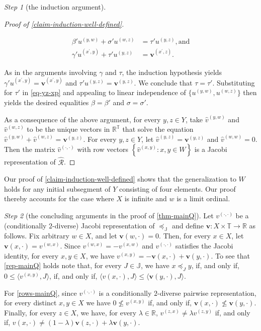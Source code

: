 \documentclass[ecta,nameyear,draft]{econsocart}
\newcommand{\R}{\mathbb R}
\newcommand{\hext}{\mathrel{\hat{\mathrel{\mathcal R}}}}
\newcommand{\mbbt}{{\mathds {T}}}
\newcommand{\mbbj}{\mathds J}
\newcommand{\xy}{{(x, y)}}
\newcommand{\yz}{{(y,z)}}
\newcommand{\zy}{{(z,y)}}
\newcommand{\zx}{{(z,x)}}
\newcommand{\xw}{{(x,w)}}
\newcommand{\wx}{{(w,x)}}
\newcommand{\yw}{{(y,w)}}
\newcommand{\wz}{(w,z)}
\newcommand{\xpy}{(x^{\prime},y)}
\newcommand{\xpz}{(x^{\prime},z)}
\newcommand{\dd}{{(\cdot,\cdot)}}
\renewcommand{\v}{{\mathbf{v}}}
\theoremstyle{plain}
\theoremstyle{remark}
\newtheorem{step}{Step}[section]
\begin{document}
\begin{appendix}
\begin{step}[the induction argument]
\begin{proofEnd}
\begin{proof}[Proof of \cref{claim-induction-well-defined}]
\begin{linenomath*}
\begin{align}
      \label{eq-yz-xp}
      \beta' u^{\yw} + \sigma' u^{\wz}& = \tau' u^{\yz}, \text{and}\\
      \label{eq-xpz-y}
      \gamma' u^{\xpy} + \tau' u^{\yz} &= \v^{\xpz}.
   \end{align}
  \end{linenomath*}
  \addtocounter{linenumber}{-1} As in the arguments involving $\gamma$ and
  $\tau$, the induction hypothesis yields
  $\gamma ' u^{\xpy} = \v^{\xpy}$ and $\tau ' u^{\yz} = \v^{\yz}$.
  We conclude that $\tau = \tau'$.  Substituting for $\tau'$ in \cref{eq-yz-xp}
  and appealing to linear independence of $\{u^{\yw}, u^{\wz}\}$ then yields the
  desired equalities $\beta = \beta'$ and $\sigma = \sigma '$.
    
    As a consequence of the above argument, for every $y , z \in Y$, take
    $\hat{v}^{\yw}$ and $\hat{v}^{\wz}$ to be the unique vectors in $\R^{\mbbt}$
    that solve the equation $\hat{v}^{\yw} + \hat{v}^{\wz} = \v^{\yz}$.
    For every $y , z \in Y$, let $\hat{v}^{\yz} = \v^{\yz}$ and $\hat{v}^{(w,w)}
    = 0$.  Then the matrix $\hat{v}^{\dd}$ with row vectors $\left\{
      \hat{v}^{\xy}: x , y \in W \right\}$ is a Jacobi representation of $\hext$.
  \end{proof}
  Our proof of \cref{claim-induction-well-defined} shows that the
  generalization to $W$ holds for any initial subsegment of $Y$ consisting of
  four elements. Our proof thereby accounts for the case where $X$ is infinite
  and $w$ is a limit ordinal.
  \end{proofEnd}
  \end{step}
  
  \begin{step}[the concluding arguments in the proof of \cref{thm-mainQ}]
    \label{step-conc-mainQ}
    Let $v^{\dd}$ be a (conditionally $2$-diverse) Jacobi representation of
    $\preceq_{\mbbj}$ and define $\mathbf{v}: X\times \mbbt \rightarrow \R$ as
    follows. Fix arbitrary $w\in X$, and let $\mathbf{v}(w,\cdot) = 0$. Then,
    for every $x\in X$, let $\mathbf{v}(x,\cdot) = v^{\wx}$. Since $v^{\wx}=
    -v^{\xw}$ and $v^{\dd}$ satisfies the Jacobi identity, for every $x,y\in
    X$, we have $v^{\xy} =  -\mathbf{v}(x,\cdot) + \mathbf{v}(y,\cdot)$. To see
    that \ref{rep-mainQ} holds note that, for every $J\in \mbbj$, we have $x
    \preceq_{J} y$, if, and only if, $0 \leq
    \langle v^{\xy}, J \rangle$, if, and only if, $\langle v(x,\cdot),
    J \rangle \leq \langle \mathbf{v}(y,\cdot), J \rangle$.

    For \ref{rows-mainQ}, since $v^{\dd}$ is a conditionally $2$-diverse
    pairwise representation, for every distinct $x,y\in X$ we have $0 \not \leq
    v^{\xy}$ if, and only if, $\mathbf{v}(x,\cdot) \not \leq 
    \mathbf{v}(y,\cdot)$. Finally, for every $z\in X$, we have, for every
    $\lambda \in \R$, $v^{\zx} \neq \lambda v^{\zy}$ if, and only if,
    $v(x,\cdot) \neq (1-\lambda) \mathbf{v}(z,\cdot ) + \lambda
    \mathbf{v}(y,\cdot)$.


\end{step}
\end{appendix}
\end{document}
